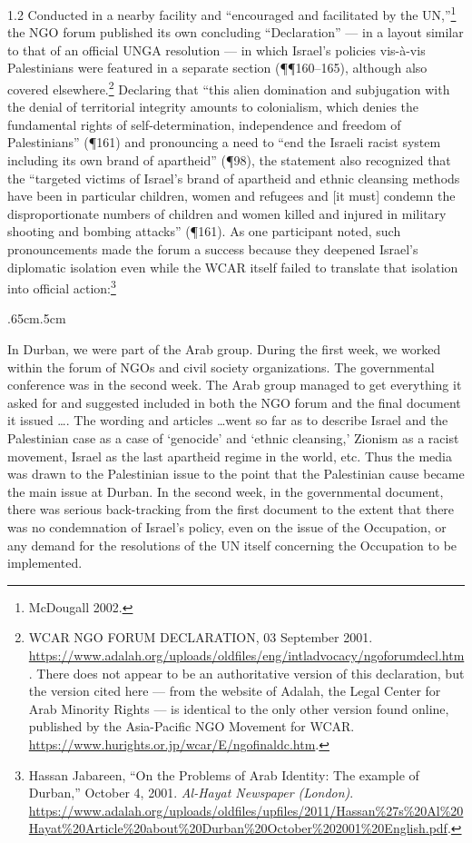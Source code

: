 \documentclass[../unravbook.tex]{subfiles}
\begin{document}
\begin{spacing}{1.2}
Conducted in a nearby facility and ``encouraged and facilitated by the UN,''\footnote{McDougall 2002.} the NGO forum published its own concluding \enquote{Declaration} --- in a layout similar to that of an official UNGA resolution --- in which Israel's policies vis-à-vis Palestinians were featured in a separate section (\P\P 160--165), although also covered elsewhere.\footnote{WCAR NGO FORUM DECLARATION, 03 September 2001. \url{https://www.adalah.org/uploads/oldfiles/eng/intladvocacy/ngoforumdecl.htm}. There does not appear to be an authoritative version of this declaration, but the version cited here --- from the website of Adalah, the Legal Center for Arab Minority Rights --- is identical to the only other version found online, published by the Asia-Pacific NGO Movement for WCAR. \url{https://www.hurights.or.jp/wcar/E/ngofinaldc.htm}.} Declaring that \enquote{this alien domination and subjugation with the denial of territorial integrity amounts to colonialism, which denies the fundamental rights of self-determination, independence and freedom of Palestinians} (\P 161) and pronouncing a need to ``end the Israeli racist system including its own brand of apartheid'' (\P 98), the statement also recognized that the \enquote{targeted victims of Israel's brand of apartheid and ethnic cleansing methods have been in particular children, women and refugees and [it must] condemn the disproportionate numbers of children and women killed and injured in military shooting and bombing attacks} (\P 161). As one participant noted, such pronouncements made the forum a success because they deepened Israel's diplomatic isolation even while the WCAR itself failed to translate that isolation into official action:\footnote{Hassan Jabareen, ``On the Problems of Arab Identity: The example of Durban,'' October 4, 2001. \textit{Al-Hayat Newspaper (London)}. \url{https://www.adalah.org/uploads/oldfiles/upfiles/2011/Hassan\%27s\%20Al\%20Hayat\%20Article\%20about\%20Durban\%20October\%202001\%20English.pdf}.}

\begin{adjustwidth}{.65cm}{.5cm}
   \begin{singlespace}
    In Durban, we were part of the Arab group. During the first week, we worked within the forum of NGOs and civil society organizations. The governmental conference was in the second week. The Arab group managed to get everything it asked for and suggested included in both the NGO forum and the final document it issued \ldots. The wording and articles \ldots went so far as to describe Israel and the Palestinian case as a case of `genocide' and `ethnic cleansing,' Zionism as a racist movement, Israel as the last apartheid regime in the world, etc. Thus the media was drawn to the Palestinian issue to the point that the Palestinian cause became the main issue at Durban. In the second week, in the governmental document, there was serious back-tracking from the first document to the extent that there was no condemnation of Israel's policy, even on the issue of the Occupation, or any demand for the resolutions of the UN itself concerning the Occupation to be implemented.
  \end{singlespace}
\end{adjustwidth}


\end{spacing}
\end{document}
